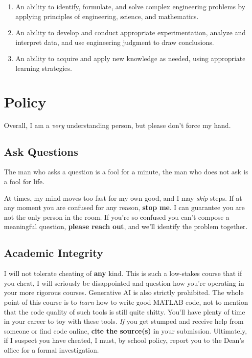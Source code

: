 \documentclass{article}
\begin{document}
\begin{enumerate}
	\slshape

	\item
		An ability to identify, formulate, and solve complex
		engineering problems by applying principles of
		engineering, science, and mathematics.

	\setcounter{enumi}{5}

	\item
		An ability to develop and conduct appropriate
		experimentation, analyze and interpret data, and use
		engineering judgment to draw conclusions.

	\item
		An ability to acquire and apply new knowledge as needed,
		using appropriate learning strategies.
\end{enumerate}

\section{Policy}

Overall, I am a \emph{very} understanding person, but please don't force
my hand.

\subsection{Ask Questions}

\begin{displayquote}[Confucius]
	The man who asks a question is a fool for a minute, the man who
	does not ask is a fool for life.
\end{displayquote}

\noindent
At times, my mind moves too fast for my own good, and I may \emph{skip}
steps.  If at any moment you are confused for any reason, \textbf{stop
me}.  I can guarantee you are not the only person in the room.  If
you're so confused you can't compose a meaningful question,
\textbf{please reach out}, and we'll identify the problem together.

\subsection{Academic Integrity}

I will not tolerate cheating of \textbf{any} kind.  This is such a
low-stakes course that if you cheat, I will seriously be disappointed
and question how you're operating in your more rigorous courses.
Generative AI is also strictly prohibited.  The whole point of this
course is to \emph{learn} how to write good MATLAB code, not to mention
that the code quality of such tools is still quite shitty.  You'll have
plenty of time in your career to toy with these tools.  \emph{If} you
get stumped and receive help from someone or find code online,
\textbf{cite the source(s)} in your submission.  Ultimately, if I
suspect you have cheated, I must, by school policy, report you to the
Dean's office for a formal investigation.
\end{document}
